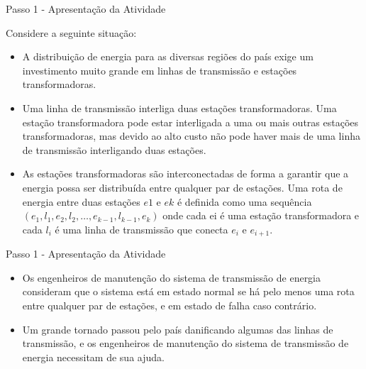 \documentclass{beamer}
\begin{document}
\begin{frame}{Passo 1 - Apresentação da Atividade}

Considere a seguinte situação:

\begin{itemize}
   
\item <1-> A distribuição de energia para as diversas regiões do país exige um investimento muito grande em linhas de transmissão e estações transformadoras. 

\item <2->Uma linha de transmissão interliga duas estações transformadoras. Uma estação transformadora pode estar interligada a uma ou mais outras estações transformadoras, mas devido ao alto custo não pode haver mais de uma linha de transmissão interligando duas estações.

\item <3->As estações transformadoras são interconectadas de forma a garantir que a energia possa ser distribuída entre qualquer par de estações. Uma rota de energia entre duas estações $e1$ e $ek$ é deﬁnida como uma sequência $(e_1 , l_1 , e_2 , l_2 , \ldots , e_{k-1} , l_{k-1} , e_k )$ onde cada ei é uma estação transformadora e cada $l_i$ é uma linha de transmissão que conecta $e_i$ e $e_{i+1}$.




\end{itemize}



\end{frame}


\begin{frame}{Passo 1 - Apresentação da Atividade}

\begin{itemize}
   
\item <1-> Os engenheiros de manutenção do sistema de transmissão de energia consideram que o sistema está em estado normal se há pelo menos uma rota entre qualquer par de estações, e em estado de falha caso contrário.

\item <2-> Um grande tornado passou pelo país daniﬁcando algumas das linhas de transmissão, e os engenheiros de manutenção do sistema de transmissão de energia necessitam de sua ajuda.


\end{itemize}


\end{frame}
\end{document}
